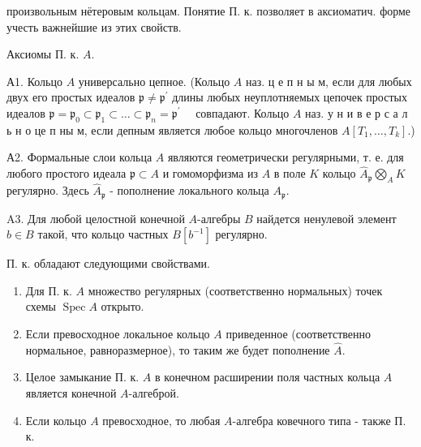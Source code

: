\documentclass[10pt]{article}
\begin{document}
произвольным нётеровым кольцам. Понятие П. к. позволяет в аксиоматич. форме учесть важнейшие из этих свойств.



Аксиомы П. к. $A$.



А1. Кольцо $A$ универсально цепное. (Кольцо $A$ наз. ц е п н ы м, если для любых двух его простых идеалов $\mathfrak{p} \neq \mathfrak{p}^{\prime}$ длины любых неуплотняемых цепочек простых идеалов $\mathfrak{p}=\mathfrak{p}_{0} \subset \mathfrak{p}_{1} \subset \ldots \subset \mathfrak{p}_{n}=\mathfrak{p}^{\prime} \quad$ совпадают. Кольцо $A$ наз. у н и в е р с а л ь н о це п ны м, если депным является любое кольцо многочленов $A\left[T_{1}, \ldots, T_{k}\right]$.)



А2. Формальные слои кольца $A$ являются геометрически регулярными, т. е. для любого простого идеала $\mathfrak{p} \subset A$ и гомоморфизма из $A$ в поле $K$ кольцо $\widehat{A}_{\mathfrak{p}} \bigotimes_{A} K$ регулярно. Здесь $\hat{A}_{\mathfrak{p}}$ - пополнение локального кольца $A_{\mathfrak{p}}$.



A3. Для любой целостной конечной $A$-алгебры $B$ найдется ненулевой элемент $b \in B$ такой, что кольцо частных $B\left[b^{-1}\right]$ регулярно.



П. к. обладают следующими свойствами.



\begin{enumerate}

  \item Для П. к. $A$ множество регулярных (соответственно нормальных) точек схемы $\operatorname{Spec} A$ открыто.



  \item Если превосходное локальное кольцо $A$ приведенное (соответственно нормальное, равноразмерное), то таким же будет пополнение $\hat{A}$.



  \item Целое замыкание П. к. $A$ в конечном расширении поля частных кольца $A$ является конечной $A$-алгеброй.



  \item Если кольцо $A$ превосходное, то любая $A$-алгебра ковечного типа - также П. к.



\end{enumerate}
\end{document}

